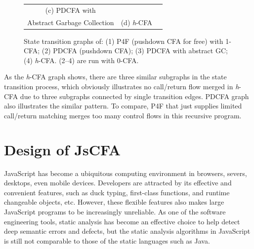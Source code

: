 \documentclass[12pt]{report}
\begin{document}
\begin{figure}
\begin{center}
\begin{tabular}{ccc}
\\
(c) PDCFA with \\Abstract Garbage Collection
&
(d) \textit{h}-CFA
\end{tabular}
\end{center}
\caption[State transition graphs]{
State transition graphs of: (1) P4F (pushdown CFA for free) with 1-CFA\@;
(2) PDCFA (pushdown CFA); (3) PDCFA with abstract GC\@; (4) \textit{h}-CFA\@.
(2--4) are run with 0-CFA\@.
}
\label{fig:state-graphs}
\end{figure}
As the \textit{h}-CFA graph shows, there are three similar subgraphs in the state transition process, which obviously illustrates
no call/return flow merged in \textit{h}-CFA due to three subgraphs connected by single transition edges.
PDCFA graph also illustrates the similar pattern.
To compare, P4F that just supplies limited call/return matching merges too many control flows in this recursive program.

\chapter{Design of JsCFA}
\label{sec:JsCFA}
JavaScript has become a ubiquitous computing environment in browsers, severs, desktops, even mobile devices. Developers are attracted by its effective and convenient features, such as duck typing, first-class functions, and runtime changeable objects, etc. However, these flexible features also makes large JavaScript programs to be increasingly unreliable.
As one of the software engineering tools, static analysis has become an effective choice to help detect deep semantic errors and defects, but the static analysis algorithms in JavaScript is still not comparable to those of the static languages such as Java.
\end{document}
